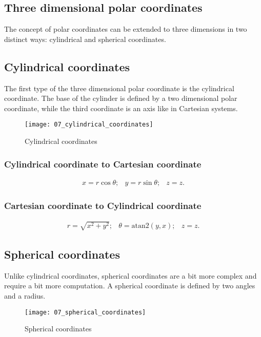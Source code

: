 \subsection{Three dimensional polar coordinates}

The concept of polar coordinates can be extended to three dimensions in two distinct ways: cylindrical and spherical coordinates.

\subsection{Cylindrical coordinates}

The first type of the three dimensional polar coordinate is the cylindrical coordinate. The base of the cylinder is defined by a two dimensional polar coordinate, while the third coordinate is an axis like in Cartesian systems.

\begin{figure}[H]
\centering
    \texttt{[image: 07\_cylindrical\_coordinates]}
\caption{Cylindrical coordinates}
\label{fig:cylindrical-coordinates}
\end{figure}

\subsubsection{Cylindrical coordinate to Cartesian coordinate}

$$
\begin{array}{lcr}
x=r\cos\theta; & y=r\sin\theta; & z=z.
\end{array}
$$

\subsubsection{Cartesian coordinate to Cylindrical coordinate}

$$
\begin{array}{lcr}
r=\sqrt{x^2+y^2}; & \theta=\text{atan2}(y,x); & z=z.
\end{array}
$$

\subsection{Spherical coordinates}

Unlike cylindrical coordinates, spherical coordinates are a bit more complex and require a bit more computation. A spherical coordinate is defined by two angles and a radius.

\begin{figure}[H]
\centering
    \texttt{[image: 07\_spherical\_coordinates]}
\caption{Spherical coordinates}
\label{fig:spherical-coordinates}
\end{figure}

